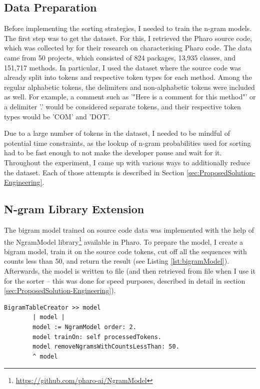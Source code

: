 \subsection{Data Preparation}
Before implementing the sorting strategies, I needed to train the n-gram models. The first step was to get the dataset. For this, I retrieved the Pharo source code, which was collected by \cite{Zait20a} for their research on characterising Pharo code. The data came from 50 projects, which consisted of 824 packages, 13,935 classes, and 151,717 methods. In particular, I used the dataset where the source code was already split into tokens and respective token types for each method. Among the regular alphabetic tokens, the delimiters and non-alphabetic tokens were included as well. For example, a comment such as '"Here is a comment for this method"' or a delimiter '.' would be considered separate tokens, and their respective token types would be 'COM' and 'DOT'.

Due to a large number of tokens in the dataset, I needed to be mindful of potential time constraints, as the lookup of n-gram probabilities used for sorting had to be fast enough to not make the developer pause and wait for it. Throughout the experiment, I came up with various ways to additionally reduce the dataset. Each of those attempts is described in Section \ref{sec:ProposedSolution-Engineering}.

\subsection{N-gram Library Extension}
The bigram model trained on source code data was implemented with the help of the NgramModel library\footnote{\url{https://github.com/pharo-ai/NgramModel}} available in Pharo. To prepare the model, I create a bigram model, train it on the source code tokens, cut off all the sequences with counts less than 50, and return the result (see Listing \ref{lst:bigramModel}). Afterwards, the model is written to file (and then retrieved from file when I use it for the sorter -- this was done for speed purposes, described in detail in section \ref{sec:ProposedSolution-Engineering}).

\begin{lstlisting}[label={lst:bigramModel}, caption={Here is how the bigram model for sorting is created and trained}]
    BigramTableCreator >> model
        | model |
        model := NgramModel order: 2.
        model trainOn: self processedTokens.
        model removeNgramsWithCountsLessThan: 50.
        ^ model
\end{lstlisting}

